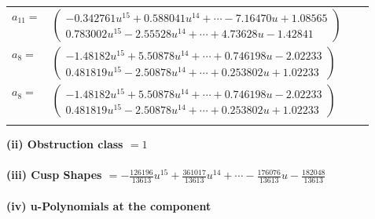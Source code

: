 \documentclass[1p]{elsarticle_modified}
\theoremstyle{definition}
\begin{document}
\begin{tabular}{m{7pt} m{180pt} m{7pt} m{180pt} }
\flushright $a_{11}=$&$\begin{pmatrix}-0.342761 u^{15}+0.588041 u^{14}+\cdots-7.16470 u+1.08565\\0.783002 u^{15}-2.55528 u^{14}+\cdots+4.73628 u-1.42841\end{pmatrix}$ \\
\flushright $a_{8}=$&$\begin{pmatrix}-1.48182 u^{15}+5.50878 u^{14}+\cdots+0.746198 u-2.02233\\0.481819 u^{15}-2.50878 u^{14}+\cdots+0.253802 u+1.02233\end{pmatrix}$\\ \flushright $a_{8}=$&$\begin{pmatrix}-1.48182 u^{15}+5.50878 u^{14}+\cdots+0.746198 u-2.02233\\0.481819 u^{15}-2.50878 u^{14}+\cdots+0.253802 u+1.02233\end{pmatrix}$\\&\end{tabular}
\flushleft \textbf{(ii) Obstruction class $= 1$}\\~\\
\flushleft \textbf{(iii) Cusp Shapes $= -\frac{126196}{13613} u^{15}+\frac{361017}{13613} u^{14}+\cdots-\frac{176076}{13613} u-\frac{182048}{13613}$}\\~\\
\newpage\renewcommand{\arraystretch}{1}
\flushleft \textbf{(iv) u-Polynomials at the component}\newline \\
\end{document}
